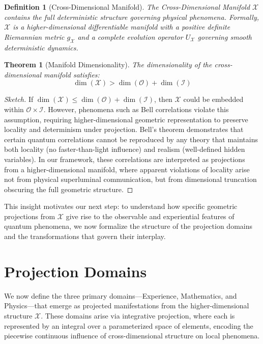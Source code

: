 \documentclass{article}
\newtheorem{definition}{Definition}
\newtheorem{theorem}{Theorem}
\begin{document}
\begin{definition}[Cross-Dimensional Manifold]
The Cross-Dimensional Manifold $\mathcal{X}$ contains the full deterministic structure governing physical phenomena. Formally, $\mathcal{X}$ is a higher-dimensional differentiable manifold with a positive definite Riemannian metric $g_{\mathcal{X}}$ and a complete evolution operator $U_{\mathcal{X}}$ governing smooth deterministic dynamics.
\end{definition}

\begin{theorem}[Manifold Dimensionality]
\label{thm:dimensionality}
The dimensionality of the cross-dimensional manifold satisfies:
\begin{equation}
\dim(\mathcal{X}) > \dim(\mathcal{O}) + \dim(\mathcal{I})
\end{equation}
\end{theorem}

\begin{proof}[Sketch]
If $\dim(\mathcal{X}) \leq \dim(\mathcal{O}) + \dim(\mathcal{I})$, then $\mathcal{X}$ could be embedded within $\mathcal{O} \times \mathcal{I}$. However, phenomena such as Bell correlations violate this assumption, requiring higher-dimensional geometric representation to preserve locality and determinism under projection. Bell's theorem demonstrates that certain quantum correlations cannot be reproduced by any theory that maintains both locality (no faster-than-light influence) and realism (well-defined hidden variables). In our framework, these correlations are interpreted as projections from a higher-dimensional manifold, where apparent violations of locality arise not from physical superluminal communication, but from dimensional truncation obscuring the full geometric structure.
\end{proof}

This insight motivates our next step: to understand how specific geometric projections from \(\mathcal{X}\) give rise to the observable and experiential features of quantum phenomena, we now formalize the structure of the projection domains and the transformations that govern their interplay.

\section{Projection Domains}

We now define the three primary domains—Experience, Mathematics, and Physics—that emerge as projected manifestations from the higher-dimensional structure $\mathcal{X}$. These domains arise via integrative projection, where each is represented by an integral over a parameterized space of elements, encoding the piecewise continuous influence of cross-dimensional structure on local phenomena.
\end{document}
